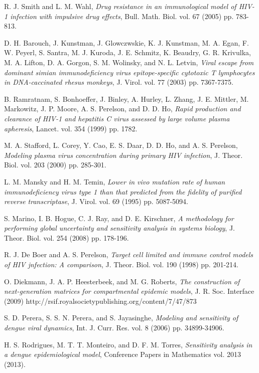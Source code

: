 \documentclass[11pt, oneside]{article}    %
\begin{document}
\begin{thebibliography}{99}
R. J. Smith and L. M. Wahl,  {\em Drug resistance in an immunological model of HIV-1 infection with impulsive drug effects}, Bull. Math. Biol. vol. 67 (2005) pp. 783-813.

D. H. Barouch, J. Kunstman, J. Glowczwskie, K. J. Kunstman, M. A. Egan, F. W. Peyerl, S. Santra, M. J. Kuroda, J. E. Schmitz, K. Beaudry, G. R. Krivulka, M. A. Lifton, D. A. Gorgon, S. M. Wolinsky, and N. L. Letvin,  {\em Viral escape from dominant simian immunodeficiency virus epitope-specific cytotoxic T lymphocytes in DNA-caccinated rhesus monkeys}, J. Virol. vol. 77 (2003) pp. 7367-7375.

B. Ramratnam, S. Bonhoeffer, J. Binley, A. Hurley, L. Zhang, J. E. Mittler, M. Markowitz, J. P. Moore, A. S. Perelson, and D. D. Ho, {\em Rapid production and clearance of HIV-1 and hepatitis C virus assessed by large volume plasma apheresis}, Lancet. vol. 354 (1999) pp. 1782.

M. A. Stafford, L. Corey, Y. Cao, E. S. Daar, D. D. Ho, and A. S. Perelson,  {\em Modeling plasma virus concentration during primary HIV infection}, J. Theor. Biol. vol. 203 (2000) pp. 285-301.

L. M. Mansky and H. M. Temin, {\em Lower in vivo mutation rate of human immunodeficiency virus type 1 than that predicted from the fidelity of purified reverse transcriptase}, J. Virol. vol. 69 (1995) pp. 5087-5094.

S. Marino, I. B. Hogue, C. J. Ray, and D. E. Kirschner,  {\em A methodology for performing global uncertainty and sensitivity analysis in systems biology}, J. Theor. Biol. vol. 254 (2008) pp. 178-196.

R. J. De Boer and A. S. Perelson, {\em Target cell limited and immune control models of HIV jnfection: A comparison}, J. Theor. Biol. vol. 190 (1998) pp. 201-214.

O. Diekmann, J. A. P. Heesterbeek, and M. G. Roberts, {\em The construction of next-generation matrices for compartmental epidemic models}, J. R. Soc. Interface (2009) http://rsif.royalsocietypublishing.org/content/7/47/873

S. D. Perera, S. S. N. Perera, and S. Jayasinghe, {\em Modeling and sensitivity of dengue viral dynamics}, Int. J. Curr. Res. vol. 8 (2006) pp. 34899-34906.

H. S. Rodrigues, M. T. T. Monteiro, and D. F. M. Torres, {\em Sensitivity analysis in a dengue epidemiological model}, Conference Papers in Mathematics vol. 2013 (2013).






\end{thebibliography}
\end{document}
